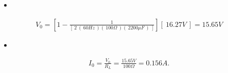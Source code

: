 \begin{itemize}
\item {\bfseries\itshape{}} \hfill \break
{\bfseries\itshape{}}
\end{itemize}

\begin{ceqn}
\begin{align}
V_{0} = [ 1 - \frac{1}{[\ 2\ (\ 60Hz\ )(\ 100\Omega\ )(\ 2200\mu F\ )\ ] }][\ 16.27 V\ ] = 15.65 V
\end{align}
\end{ceqn}

\begin{itemize}
\item {\bfseries\itshape{}} \hfill \break
{\bfseries\itshape{}}
\end{itemize}

\begin{ceqn}
\begin{align}
I_{0} = \frac{V_{0}}{R_{L}} = \frac{15.65V}{100\Omega} = 0.156 A.
\end{align}
\end{ceqn}

\pagebreak